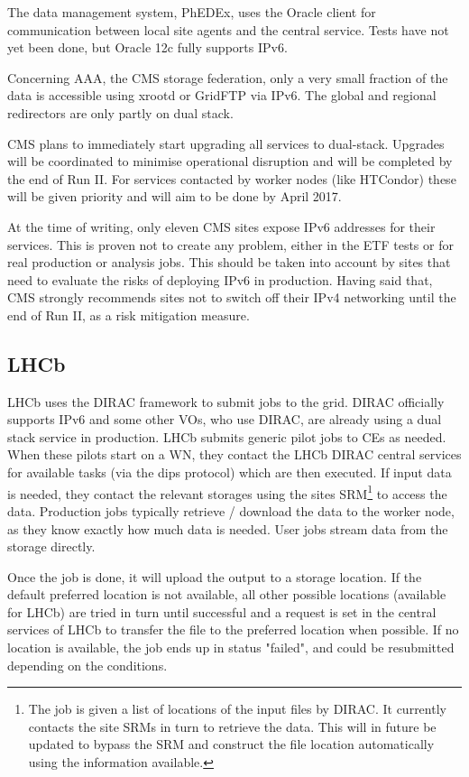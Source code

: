 \documentclass[a4paper]{jpconf}
\begin{document}
The data management system, PhEDEx, uses the Oracle client for communication between local site agents and the central service. Tests
have not yet been done, but Oracle 12c fully supports IPv6.

Concerning AAA, the CMS storage federation, only a very small fraction of the data is accessible using xrootd or GridFTP via IPv6. The global and regional redirectors are only partly on dual stack.

CMS plans to immediately start upgrading all services to dual-stack.  Upgrades will be coordinated to minimise operational disruption and will be completed by the end of Run II.  For services contacted by worker nodes (like HTCondor) these will be given priority and will aim to be done by April 2017. 

At the time of writing, only eleven CMS sites expose IPv6 addresses for their services. This is proven not to create any problem, either in the ETF tests or for real production or analysis jobs. This should be taken into account by sites that need to evaluate the risks of deploying IPv6 in production.  Having said that, CMS strongly recommends sites not to switch off their IPv4 networking until the end of Run II, as a risk mitigation measure.


\subsection{LHCb}
LHCb uses the DIRAC framework to submit jobs to the grid. DIRAC officially supports IPv6 and some other VOs, who use DIRAC, are already using a dual stack service in production.  LHCb submits generic pilot jobs to CEs as needed. When these pilots start on a WN, they contact the LHCb DIRAC central services for available tasks (via the dips protocol) which are then executed. If input data is needed, they contact the relevant storages using the sites SRM\footnote{The job is given a list of locations of the input files by DIRAC. It currently contacts the site SRMs in turn to retrieve the data. This will in future be updated to bypass the SRM and construct the file location automatically using the information available.} to access the data.  Production jobs typically retrieve / download the data to the worker node, as they know exactly how much data is needed. User jobs stream data from the storage directly.

Once the job is done, it will upload the output to a storage location. If the default preferred location is not available, all other possible locations (available for LHCb) are tried in turn until successful and a request is set in the central services of LHCb to transfer the file to the preferred location when possible. If no location is available, the job ends up in status "failed", and could be resubmitted depending on the conditions.
\end{document}
